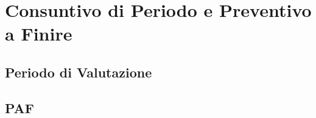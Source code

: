 \section{Consuntivo di Periodo e Preventivo a Finire}

\subsection{Periodo di Valutazione}

\subsection{PAF}